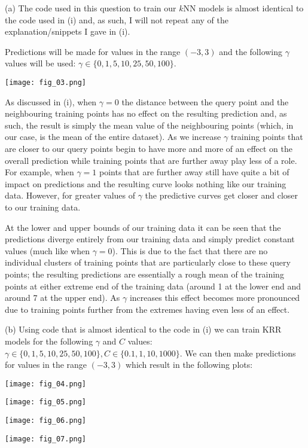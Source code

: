 \documentclass[12pt]{article}
\begin{document}
\noindent (a) The code used in this question to train our $k$NN models is almost identical to the code used in (i) and, as such, I will not repeat any of the explanation/snippets I gave in (i).

Predictions will be made for values in the range $(-3, 3)$ and the following $\gamma$ values will be used: $\gamma \in \{0, 1, 5, 10, 25, 50, 100\}$.

\begin{center}
    \texttt{[image: fig\_03.png]}
\end{center}

As discussed in (i), when $\gamma = 0$ the distance between the query point and the neighbouring training points has no effect on the resulting prediction and, as such, the result is simply the mean value of the neighbouring points (which, in our case, is the mean of the entire dataset). As we increase $\gamma$ training points that are closer to our query points begin to have more and more of an effect on the overall prediction while training points that are further away play less of a role. For example, when $\gamma = 1$ points that are further away still have quite a bit of impact on predictions and the resulting curve looks nothing like our training data. However, for greater values of $\gamma$ the predictive curves get closer and closer to our training data.

At the lower and upper bounds of our training data it can be seen that the predictions diverge entirely from our training data and simply predict constant values (much like when $\gamma = 0$). This is due to the fact that there are no individual clusters of training points that are particularly close to these query points; the resulting predictions are essentially a rough mean of the training points at either extreme end of the training data (around 1 at the lower end and around 7 at the upper end). As $\gamma$ increases this effect becomes more pronounced due to training points further from the extremes having even less of an effect.

\noindent (b) Using code that is almost identical to the code in (i) we can train KRR models for the following $\gamma$ and $C$ values: $\gamma \in \{0, 1, 5, 10, 25, 50, 100\}, C \in \{0.1, 1, 10, 1000\}$. We can then make predictions for values in the range $(-3, 3)$ which result in the following plots:

\begin{center}
    \texttt{[image: fig\_04.png]}
    
    \texttt{[image: fig\_05.png]}
    
    \texttt{[image: fig\_06.png]}
    
    \texttt{[image: fig\_07.png]}
\end{center}
\end{document}

